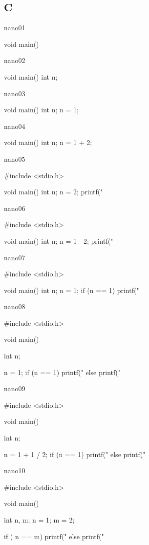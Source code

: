 \documentclass[12pt,a4paper,twoside]{article}
\begin{document}
\subsection{C}
nano01
\begin{terminal}
    void main() {
    }
\end{terminal}
nano02
\begin{terminal}
    void main() {
      int n;
    }
\end{terminal}
nano03
\begin{terminal}
    void main() {
      int n;
      n = 1;
    }
\end{terminal}
nano04
\begin{terminal}
    void main() {
      int n;
      n = 1 + 2;
    }
\end{terminal}
nano05
\begin{terminal}
    #include <stdio.h>
    
    void main() {
      int n;
      n = 2;
      printf("%
    }
\end{terminal}
nano06
\begin{terminal}
    #include <stdio.h>
    
    void main() {
      int n;
      n = 1 - 2;
      printf("%
    }
\end{terminal}
nano07
\begin{terminal}
    #include <stdio.h>
    
    void main() {
      int n;
      n = 1;
      if (n == 1)
        printf("%
    }
\end{terminal}
nano08
\begin{terminal}
    #include <stdio.h>

    void main() {
      int n;
    
      n = 1;
      if (n == 1)
        printf("%
      else
        printf("%
    }
\end{terminal}
nano09
\begin{terminal}
    #include <stdio.h>

    void main() {
      int n;
    
      n = 1 + 1 / 2;
      if (n == 1)
        printf("%
      else
        printf("%
    }
\end{terminal}
nano10
\begin{terminal}
    #include <stdio.h>
    
    void main() {
      int n, m;
      n = 1;
      m = 2;
    
     if ( n == m) 
        printf("%
     else
        printf("%
    
    }

\end{terminal}
\end{document}
